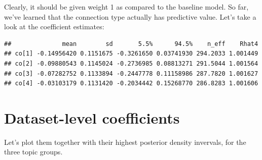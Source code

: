 \documentclass[12pt,]{book}
\begin{document}
\normalsize

Clearly, it should be given weight 1 as compared to the baseline model.
So far, we've learned that the connection type actually has predictive
value. Let's take a look at the coefficient estimates:

\vspace{1mm} \footnotesize

\begin{verbatim}
##              mean        sd       5.5%      94.5%    n_eff    Rhat4
## co[1] -0.14956420 0.1151675 -0.3261650 0.03741930 294.2033 1.001449
## co[2] -0.09880543 0.1145024 -0.2736985 0.08813271 291.5044 1.001564
## co[3] -0.07282752 0.1133894 -0.2447778 0.11158986 287.7820 1.001627
## co[4] -0.03103179 0.1131420 -0.2034442 0.15268770 286.8283 1.001606
\end{verbatim}

\normalsize

\section{\texorpdfstring{Dataset-level coefficients
\label{sec:datasetsLevelCoeffs}}{Dataset-level coefficients }}\label{dataset-level-coefficients}

\noindent Let's plot them together with their highest posterior density
invervals, for the three topic groups.
\end{document}
